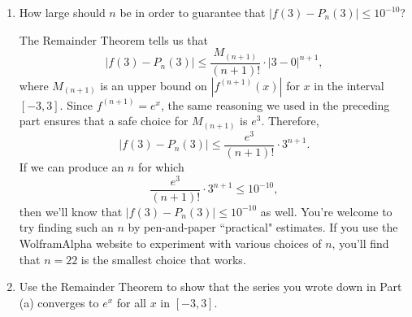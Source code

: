 \documentclass[main]{subfiles}
\begin{document}
\begin{enumerate}
\begin{enumerate}
     \begin{solution}
	Using the notation in the statement of the Remainder Theorem, we'll apply the theorem using
        $n = 10$, $d = 3$, and $c = 0$.  To do so, we need to supply $M_{(11)}$, an upper bound on
        $|f^{(11)}(x)|$ for $x$ the interval $[-3,3]$.  Since $f^{(11)}(x) = e^{x}$ is positive and increasing,
        we see that $|f^{(11)}(x)|$ achieves a maximum at the right endpoint of the domain $[-3,3]$.
        Therefore, a safe choice for $M_{(11)}$ would be
        $$
	  M_{(11)} = e^{3}.
        $$
        The Remainder Theorem tells us that
        $$
          |f(3) - P_{10}(3)| \leq \frac{e^{3}}{11!}\cdot (3-0)^{11} \leq 0.08914.
        $$
        In fact, it also tells us that $|f(x) - P_{10}(x)| \leq 0.08914$ {\em for all $x$}
        in the domain $[-3, 3]$.
     \end{solution}

     \item 
     \begin{problem}[1in]
       How large should $n$ be in order to guarantee that $|f(3) - P_{n}(3)| \leq 10^{-10}$?    
     \end{problem}

     \begin{solution}
        The Remainder Theorem tells us that
        $$
          |f(3) - P_{n}(3)| \leq \frac{M_{(n+1)}}{(n+1)!}\cdot |3-0|^{n+1},
        $$
        where $M_{(n+1)}$ is an upper bound on $|f^{(n+1)}(x)|$ for $x$ in the
        interval $[-3,3]$.  Since $f^{(n+1)} = e^{x}$, the same reasoning we
        used in the preceding part ensures that a safe choice for $M_{(n+1)}$ is $e^{3}$.
        Therefore,
        $$
          |f(3) - P_{n}(3)| \leq \frac{e^{3}}{(n+1)!}\cdot 3^{n+1}.
        $$
        If we can produce an $n$ for which
        $$
          \frac{e^{3}}{(n+1)!}\cdot 3^{n+1} \leq 10^{-10},
        $$
        then we'll know that $|f(3) - P_{n}(3)| \leq 10^{-10}$ as well.  You're welcome
        to try finding such an $n$ by pen-and-paper ``practical" estimates.  If you use 
        the WolframAlpha website to experiment with various choices of $n$, you'll find
        that $n = 22$ is the smallest choice that works.  
     \end{solution}

     \item 
     \begin{problem}[1in]
       Use the Remainder Theorem to show that the series you wrote down in Part (a)
       converges to $e^{x}$ for all $x$ in $[-3,3]$.  
     \end{problem}


\end{enumerate}
\end{enumerate}
\end{document}
